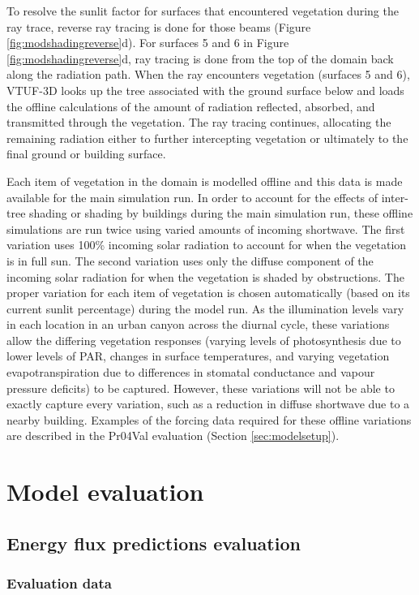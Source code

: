 \documentclass[final,3p,times,authoryear]{elsarticle}
\begin{document}
To resolve the sunlit factor for surfaces that encountered vegetation during the ray trace, reverse ray tracing is done for those beams (Figure \ref{fig:modshadingreverse}d). For surfaces 5 and 6 in Figure \ref{fig:modshadingreverse}d, ray tracing is done from the top of the domain back along the radiation path. When the ray encounters vegetation (surfaces 5 and 6), VTUF-3D looks up the tree associated with the ground surface below and loads the offline calculations of the amount of radiation reflected, absorbed, and transmitted through the vegetation. The ray tracing continues, allocating the remaining radiation either to further intercepting vegetation or ultimately to the final ground or building surface.

Each item of vegetation in the domain is modelled offline and this data is made available for the main simulation run. In order to account for the effects of inter-tree shading or shading by buildings during the main simulation run, these offline simulations are run twice using varied amounts of incoming shortwave. The first variation uses 100\% incoming solar radiation to account for when the vegetation is in full sun. The second variation uses only the diffuse component of the incoming solar radiation for when the vegetation is shaded by obstructions. The proper variation for each item of vegetation is chosen automatically (based on its current sunlit percentage) during the model run. As the illumination levels vary in each location in an urban canyon across the diurnal cycle, these variations allow the differing vegetation responses (varying levels of photosynthesis due to lower levels of PAR, changes in surface temperatures, and varying vegetation evapotranspiration due to differences in stomatal conductance and vapour pressure deficits) to be captured. However, these variations will not be able to exactly capture every variation, such as a reduction in diffuse shortwave due to a nearby building. Examples of the forcing data required for these offline variations are described in the Pr04Val evaluation (Section \ref{sec:modelsetup}).

\section{Model evaluation}
\subsection{Energy flux predictions evaluation}
\subsubsection{Evaluation data}\label{sec:Validation}
\end{document}
